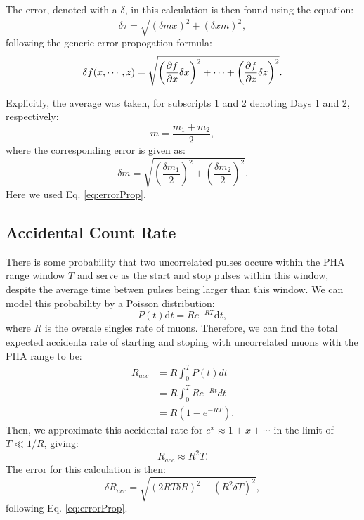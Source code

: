 \documentclass[
    aps, 
    twocolumn, 
    secnumarabic, 
    balancelastpage, 
    amsmath, 
    amssymb, 
    nofootinbib, 
    floatfix
]{revtex4-2}
\begin{document}
The error, denoted with a $\delta$, in this calculation is then found using the equation:
\begin{equation}
	\delta \tau = \sqrt{(\delta mx)^2 + (\delta x m)^2},
	\label{eq:timeConvertErr}
\end{equation}
following the generic error propogation formula:
\begin{equation}
	\delta f(x, \cdots, z) = \sqrt{\left(\pdv{f}{x}\delta x\right)^2 + \cdots + \left(\pdv{f}{z}\delta z\right)^2}.
	\label{eq:errorProp}
\end{equation}

Explicitly, the average was taken, for subscripts 1 and 2 denoting Days 1 and 2, respectively:
\begin{equation}
	m = \dfrac{m_1 + m_2}{2},
	\label{eq:timeConvertCalc}
\end{equation}
where the corresponding error is given as:
\begin{equation}
	\delta m = \sqrt{\left(\dfrac{\delta m_1}{2} \right)^2 + \left(\dfrac{\delta m_2}{2} \right)^2}.
	\label{eq:timeConvertCalcErr}
\end{equation}
Here we used Eq. \eqref{eq:errorProp}. 

\subsection{Accidental Count Rate}
\label{sec:accidentRate}

There is some probability that two uncorrelated pulses occure within the PHA range window $T$ and serve as the start and stop pulses within this window, despite the average time betwen pulses being larger than this window. We can model this probability by a Poisson distribution:
\begin{equation}
	P(t)\text{d}t = Re^{-RT}\text{d}t, 
\end{equation}
where $R$ is the overale singles rate of muons. Therefore, we can find the total expected accidenta rate of starting and stoping with uncorrelated muons with the PHA range to be:
\begin{align}
	R_{acc} &= R\displaystyle\int_{0}^{T} P(t) dt \\ 
		&= R \displaystyle\int_{0}^{T} Re^{-Rt}dt \\ 
		&= R\left(1-e^{-RT}\right).
\end{align}
Then, we approximate this accidental rate for $e^{x} \approx 1 + x + \cdots$ in the limit of $T \ll 1/R$, giving:
\begin{equation}
	R_{acc}\approx R^2T.
	\label{eq:raccExp}
\end{equation}
The error for this calculation is then:
\begin{equation}
	\delta R_{acc} = \sqrt{\left(2RT\delta R \right)^2 + \left(R^2\delta T\right)^2},
	\label{eq:raccExpErr}
\end{equation}
following Eq. \eqref{eq:errorProp}. 
\end{document}

